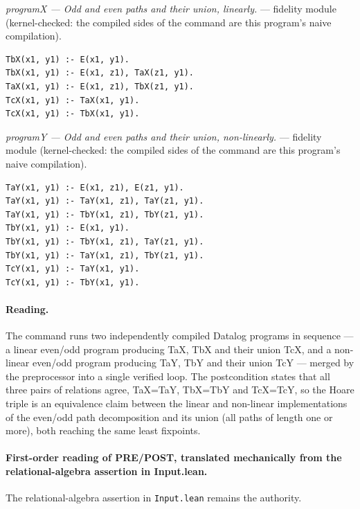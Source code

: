 \documentclass[10pt]{article}
\begin{document}
{\raggedright\textit{programX --- Odd and even paths and their union, linearly.} --- fidelity module (kernel-checked: the compiled sides of the command are this program's naive compilation).\par}

\begin{Verbatim}[fontsize=\scriptsize,breaklines=true,breakanywhere=true,frame=single,framesep=1.5mm]
TbX(x1, y1) :- E(x1, y1).
TbX(x1, y1) :- E(x1, z1), TaX(z1, y1).
TaX(x1, y1) :- E(x1, z1), TbX(z1, y1).
TcX(x1, y1) :- TaX(x1, y1).
TcX(x1, y1) :- TbX(x1, y1).
\end{Verbatim}

{\raggedright\textit{programY --- Odd and even paths and their union, non-linearly.} --- fidelity module (kernel-checked: the compiled sides of the command are this program's naive compilation).\par}

\begin{Verbatim}[fontsize=\scriptsize,breaklines=true,breakanywhere=true,frame=single,framesep=1.5mm]
TaY(x1, y1) :- E(x1, z1), E(z1, y1).
TaY(x1, y1) :- TaY(x1, z1), TaY(z1, y1).
TaY(x1, y1) :- TbY(x1, z1), TbY(z1, y1).
TbY(x1, y1) :- E(x1, y1).
TbY(x1, y1) :- TbY(x1, z1), TaY(z1, y1).
TbY(x1, y1) :- TaY(x1, z1), TbY(z1, y1).
TcY(x1, y1) :- TaY(x1, y1).
TcY(x1, y1) :- TbY(x1, y1).
\end{Verbatim}

\paragraph{Reading.} The command runs two independently compiled Datalog programs in sequence --- a linear even/odd program producing TaX, TbX and their union TcX, and a non-linear even/odd program producing TaY, TbY and their union TcY --- merged by the preprocessor into a single verified loop. The postcondition states that all three pairs of relations agree, TaX=TaY, TbX=TbY and TcX=TcY, so the Hoare triple is an equivalence claim between the linear and non-linear implementations of the even/odd path decomposition and its union (all paths of length one or more), both reaching the same least fixpoints.

\paragraph{First-order reading of PRE/POST, translated mechanically from the relational-algebra assertion in Input.lean.} The relational-algebra assertion in \texttt{Input.lean} remains the authority.
\end{document}
